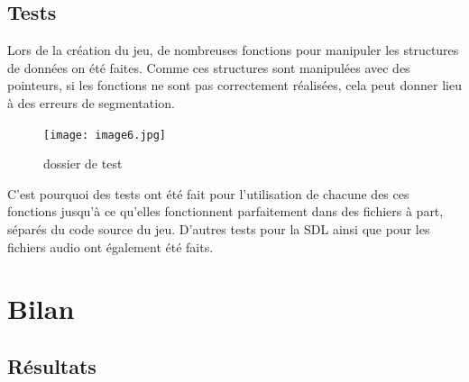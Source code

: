 \documentclass[a4paper,11pt]{article}
\begin{document}
\subsection{Tests}
Lors de la création du jeu, de nombreuses fonctions pour manipuler les structures de données on été faites. Comme ces structures sont manipulées avec
des pointeurs, si les fonctions ne sont pas correctement réalisées, cela peut donner lieu à des erreurs de segmentation.
\begin{figure}[ht!]
\centering
\texttt{[image: image6.jpg]} 
\caption {\label{image9} dossier de test}
\end{figure}
 \smallbreak
C'est pourquoi des tests ont été fait pour l'utilisation de chacune des ces fonctions jusqu'à ce qu'elles fonctionnent parfaitement dans des fichiers
à part, séparés du code source du jeu.
D'autres tests pour la SDL ainsi que pour les fichiers audio ont également été faits.

\section{Bilan}
\subsection{Résultats}
\end{document}

